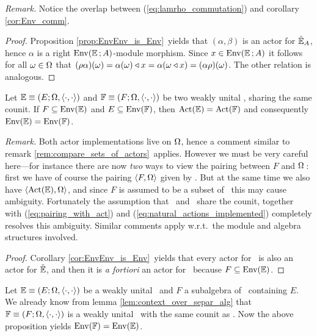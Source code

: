 {\em Remark\@.}
Notice the overlap between (\ref{eq:lamrho_commutation}) and corollary \ref{cor:Env_comm}\@.
\vspace{1ex}

\begin{proof}
  Proposition \ref{prop:EnvEnv_is_Env}\ yields that $(\alpha,\beta)$
  is an actor for $\tilde{\mathbb{E}}_A$, hence $\alpha$ is a right
  ${\rm Env}(\mathbb{E}\,;A)$-module morphism.
  Since $x\in {\rm Env}(\mathbb{E}\,;A)$ it follows for all $\omega \in \Omega$ that
  $(\rho\alpha)(\omega) = \alpha(\omega) \triangleleft x
             = \alpha(\omega \triangleleft x) = (\alpha\rho)(\omega)$.
  The other relation is analogous.
\end{proof}


\begin{prop_sec}
  Let\/ $\mathbb{E} \equiv (E; \Omega, \langle\cdot, \cdot\rangle)$ and\/ $\mathbb{F} \equiv (F; \Omega, \langle\cdot, \cdot\rangle)$
  be two weakly unital \contexts, sharing the same counit.
  If\/ $F\subseteq \mbox{\rm Env}(\mathbb{E})$ and\/ $E\subseteq \mbox{\rm Env}(\mathbb{F})$, then\/
  $\mbox{\rm Act}(\mathbb{E}) = \mbox{\rm Act}(\mathbb{F})$ and consequently\/ $\mbox{\rm Env}(\mathbb{E}) = \mbox{\rm Env}(\mathbb{F})$.
\end{prop_sec}

{\small {\em Remark\@.}
  Both actor implementations live on $\Omega$,
  hence a comment similar to remark \ref{rem:compare_sets_of_actors}\ applies.
  However we must be very careful here---for instance there are now
  {\em two\/} ways to view the pairing between $F$ and $\Omega\,$:
  first we have of course the pairing $\langle F,\Omega \rangle$ given by \FF\@.
  But at the same time we also have $\langle \mbox{\rm Act}(\mathbb{E}),\Omega \rangle$,
  and since $F$ is assumed to be a subset of \ActE\ this may cause ambiguity.
  Fortunately the assumption that \EE\ and \FF\ share the counit, together
  with (\ref{eq:pairing_with_act}) and (\ref{eq:natural_actions_implemented})
  completely resolves this ambiguity.
  Similar comments apply w.r.t.\ the module and algebra structures involved.}
\vspace{1ex}

\begin{proof}
  Corollary \ref{cor:EnvEnv_is_Env}\ yields that every actor for \EE\
  is also an actor for $\tilde{\mathbb{E}}$, and then it is {\em a fortiori\/} an actor for \FF\
  because $F\subseteq \mbox{\rm Env}(\mathbb{E})$.
\end{proof}


\begin{cor_sec}
  Let\/ $\mathbb{E} \equiv (E; \Omega, \langle\cdot, \cdot\rangle)$ be a weakly unital \context\ and
  $F$ a subalgebra of\/ \EnvE\ containing $E$.
  We already know from lemma \ref{lem:context_over_separ_alg} that\/
  $\mathbb{F} \equiv (F; \Omega, \langle\cdot, \cdot\rangle)$ is a weakly unital \context\
  with the same counit as\/ \EE\@.
  Now the above proposition yields\/ $\mbox{\rm Env}(\mathbb{F})=\mbox{\rm Env}(\mathbb{E})$.
\end{cor_sec}
